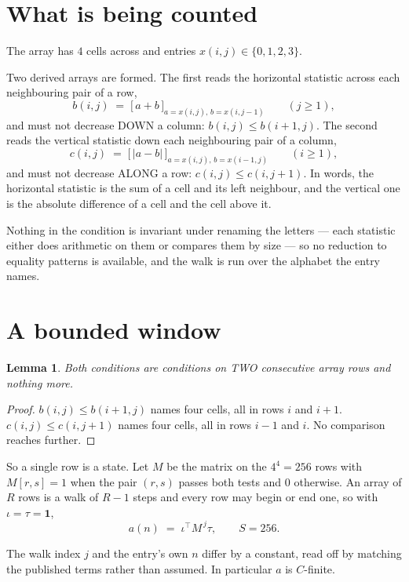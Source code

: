 \documentclass[11pt,a4paper]{article}
\theoremstyle{plain}
\newtheorem{lemma}[theorem]{Lemma}
\theoremstyle{definition}
\begin{document}
\section{What is being counted}

The array has $4$ cells across and entries $x(i,j)\in\{0,1,2,3\}$.

Two derived arrays are formed. The first reads the horizontal statistic across each
neighbouring pair of a row,
\[
b(i,j)\;=\;\bigl[\,a+b\,\bigr]_{a=x(i,j),\,b=x(i,j-1)}\qquad (j\ge1),
\]
and must not decrease DOWN a column: $b(i,j)\le b(i{+}1,j)$. The second reads the vertical
statistic down each neighbouring pair of a column,
\[
c(i,j)\;=\;\bigl[\,\lvert a-b\rvert\,\bigr]_{a=x(i,j),\,b=x(i{-}1,j)}\qquad (i\ge1),
\]
and must not decrease ALONG a row: $c(i,j)\le c(i,j{+}1)$. In words, the horizontal statistic
is the sum of a cell and its left neighbour, and the vertical one is
the absolute difference of a cell and the cell above it.

Nothing in the condition is invariant under renaming the letters --- each statistic either does
arithmetic on them or compares them by size --- so no reduction to equality patterns is
available, and the walk is run over the alphabet the entry names.

\section{A bounded window}

\begin{lemma}\label{lem:win}
Both conditions are conditions on TWO consecutive array rows and nothing more.
\end{lemma}

\begin{proof}
$b(i,j)\le b(i{+}1,j)$ names four cells, all in rows $i$ and $i+1$. $c(i,j)\le c(i,j{+}1)$
names four cells, all in rows $i-1$ and $i$. No comparison reaches further.
\end{proof}

So a single row is a state. Let $M$ be the matrix on the $4^{4}=256$ rows with
$M[r,s]=1$ when the pair $(r,s)$ passes both tests and $0$ otherwise. An array of $R$ rows is a
walk of $R-1$ steps and every row may begin or end one, so with $\iota=\tau=\mathbf{1}$,
\[
a(n)\;=\;\iota^{\!\top}M^{\,j}\tau ,\qquad S=256.
\]

The walk index $j$ and the entry's own $n$ differ by a constant, read off by matching the
published terms rather than assumed. In particular $a$ is $C$-finite.
\end{document}
